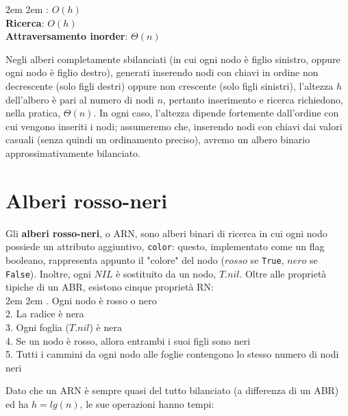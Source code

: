 \documentclass[]{article}
\def\code#1{\texttt{#1}} %
\begin{document}
\begingroup
\leftskip2em \rightskip2em
: $O(h)$\\
{\bf Ricerca}: $O(h)$\\
{\bf Attraversamento inorder}: $\Theta(n)$
\par
\endgroup

\vspace{0.20in}

\noindent Negli alberi completamente sbilanciati (in cui ogni nodo è figlio sinistro, oppure ogni nodo è figlio destro), generati inserendo nodi con chiavi in ordine non decrescente (solo figli destri) oppure non crescente (solo figli sinistri), l'altezza $h$ dell'albero è pari al numero di nodi $n$, pertanto inserimento e ricerca richiedono, nella pratica, $\Theta(n)$. In ogni caso, l'altezza dipende fortemente dall'ordine con cui vengono inseriti i nodi; assumeremo che, inserendo nodi con chiavi dai valori casuali (senza quindi un ordinamento preciso), avremo un albero binario approssimativamente bilanciato.
\raggedcolumns


\section {Alberi rosso-neri}
Gli {\bf alberi rosso-neri}, o ARN, sono alberi binari di ricerca in cui ogni nodo possiede un attributo aggiuntivo, \code{color}: questo, implementato come un flag booleano, rappresenta appunto il "colore" del nodo ($rosso$ se \code{True}, $nero$ se \code{False}). Inoltre, ogni $NIL$ è sostituito da un nodo, $T.nil$. Oltre alle proprietà tipiche di un ABR, esistono cinque proprietà RN:\\

\begingroup
\leftskip2em \rightskip2em
.  Ogni nodo è rosso o nero\\
2. La radice è nera\\
3. Ogni foglia ($T.nil$) è nera\\
4. Se un nodo è rosso, allora entrambi i suoi figli sono neri\\
5. Tutti i cammini da ogni nodo alle foglie contengono lo stesso numero di nodi neri
\par
\endgroup

\vspace{0.20in}

\noindent Dato che un ARN è sempre quasi del tutto bilanciato (a differenza di un ABR) ed ha $h = lg(n)$, le sue operazioni hanno tempi:\\
\end{document}
